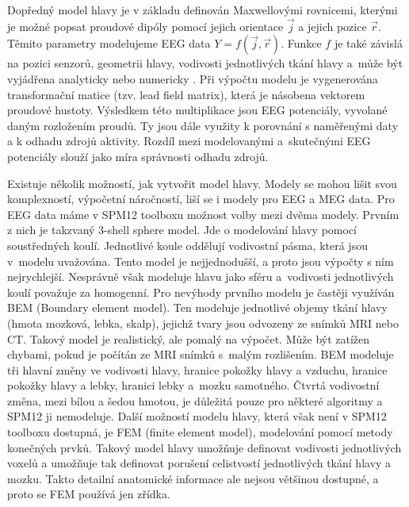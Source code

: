 Dopředný model hlavy je v základu definován Maxwellovými rovnicemi, kterými je možné popsat proudové dipóly pomocí jejich orientace $\vec{j}$ a jejich pozice $\vec{r}$. Těmito parametry modelujeme EEG data $Y=f(\vec{j}, \vec{r})$. Funkce $f$ je také závislá na pozici senzorů, geometrii hlavy, vodivosti jednotlivých tkání hlavy a~může být vyjádřena analyticky nebo numericky \cite{25}. Při výpočtu modelu je vygenerována transformační matice (tzv. lead field matrix), která je násobena vektorem proudové hustoty. Výsledkem této multiplikace jsou EEG potenciály, vyvolané daným rozložením proudů. Ty jsou dále využity k porovnání s naměřenými daty a k odhadu zdrojů aktivity. Rozdíl mezi modelovanými a~skutečnými EEG potenciály slouží jako míra správnosti odhadu zdrojů. \cite{29}

Existuje několik možností, jak vytvořit model hlavy. Modely se mohou lišit svou komplexností, výpočetní náročností, liší se i modely pro EEG a MEG data. Pro EEG data máme v SPM12 toolboxu možnost volby mezi dvěma modely. Prvním z nich je takzvaný 3-shell sphere model. Jde o modelování hlavy pomocí soustředných koulí. Jednotlivé koule oddělují vodivostní pásma, která jsou v~modelu uvažována. Tento model je nejjednodušší, a proto jsou výpočty s ním nejrychlejší. Nesprávně však modeluje hlavu jako sféru a~vodivosti jednotlivých koulí považuje za homogenní. Pro nevýhody prvního modelu je častěji využíván BEM (Boundary element model). Ten modeluje jednotlivé objemy tkání hlavy (hmota mozková, lebka, skalp), jejichž tvary jsou odvozeny ze snímků MRI nebo CT. Takový model je realistický, ale pomalý na výpočet. Může být zatížen chybami, pokud je počítán ze MRI snímků s~malým rozlišením. BEM modeluje tři hlavní změny ve vodivosti hlavy, hranice pokožky hlavy a vzduchu, hranice pokožky hlavy a lebky, hranici lebky a~mozku samotného. Čtvrtá vodivostní změna, mezi bílou a šedou hmotou, je důležitá pouze pro některé algoritmy \cite{24} a SPM12 ji nemodeluje. Další možností modelu hlavy, která však není v SPM12 toolboxu dostupná, je FEM (finite element model), modelování pomocí metody konečných prvků. Takový model hlavy umožňuje definovat vodivosti jednotlivých voxelů a umožňuje tak definovat porušení celistvostí jednotlivých tkání hlavy a mozku. Takto detailní anatomické informace ale nejsou většinou dostupné, a proto se FEM používá jen zřídka. \cite{29}

